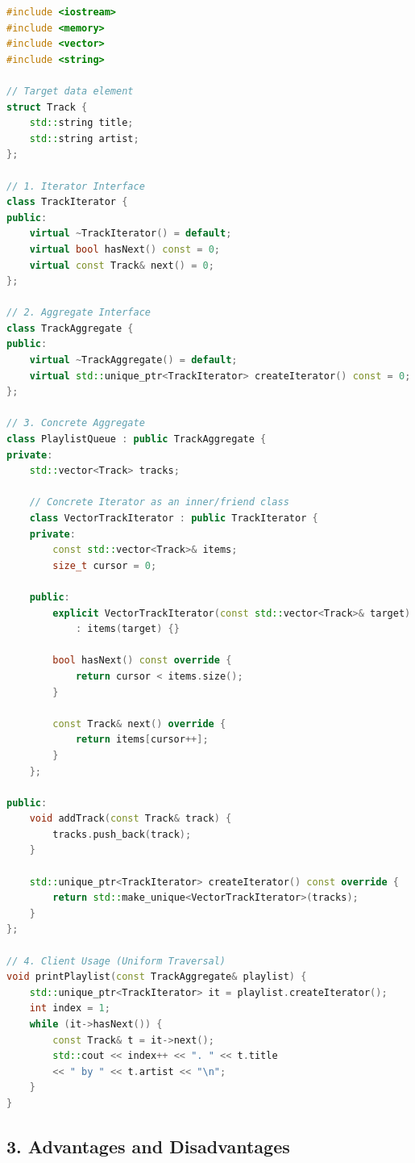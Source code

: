 \begin{lstlisting}[language=C++]
#include <iostream>
#include <memory>
#include <vector>
#include <string>

// Target data element
struct Track {
    std::string title;
    std::string artist;
};

// 1. Iterator Interface
class TrackIterator {
public:
    virtual ~TrackIterator() = default;
    virtual bool hasNext() const = 0;
    virtual const Track& next() = 0;
};

// 2. Aggregate Interface
class TrackAggregate {
public:
    virtual ~TrackAggregate() = default;
    virtual std::unique_ptr<TrackIterator> createIterator() const = 0;
};

// 3. Concrete Aggregate
class PlaylistQueue : public TrackAggregate {
private:
    std::vector<Track> tracks;

    // Concrete Iterator as an inner/friend class
    class VectorTrackIterator : public TrackIterator {
    private:
        const std::vector<Track>& items;
        size_t cursor = 0;

    public:
        explicit VectorTrackIterator(const std::vector<Track>& target)
            : items(target) {}

        bool hasNext() const override {
            return cursor < items.size();
        }

        const Track& next() override {
            return items[cursor++];
        }
    };

public:
    void addTrack(const Track& track) {
        tracks.push_back(track);
    }

    std::unique_ptr<TrackIterator> createIterator() const override {
        return std::make_unique<VectorTrackIterator>(tracks);
    }
};

// 4. Client Usage (Uniform Traversal)
void printPlaylist(const TrackAggregate& playlist) {
    std::unique_ptr<TrackIterator> it = playlist.createIterator();
    int index = 1;
    while (it->hasNext()) {
        const Track& t = it->next();
        std::cout << index++ << ". " << t.title 
        << " by " << t.artist << "\n";
    }
}
\end{lstlisting}

\subsection{3. Advantages and Disadvantages}

